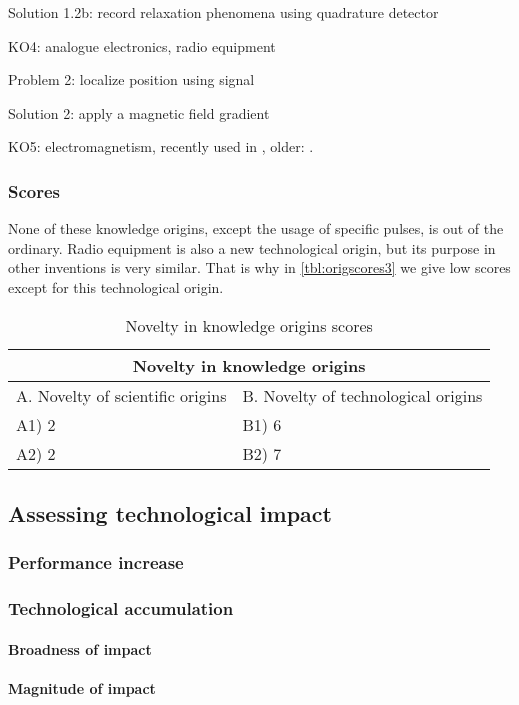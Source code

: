 Solution 1.2b: record relaxation phenomena using quadrature detector

KO4: analogue electronics, radio equipment 

Problem 2: localize position using signal

Solution 2: apply a magnetic field gradient

KO5: electromagnetism, recently used in \cite{nanogradients1, nanogradients2},
older: \cite{oldgradients}.

\subsubsection{Scores}
None of these knowledge origins, except the usage of specific pulses, is out of
the ordinary. Radio equipment is also a new technological origin, but its
purpose in other inventions is very similar. That is why in
\autoref{tbl:origscores3} we give low scores except for this technological
origin.

\begin{table}[h]
\centering
\begin{tabular}{l l}
\hline
\multicolumn{2}{|c|}{Novelty in knowledge origins} \\
\hline
A. Novelty of scientific origins & B. Novelty of technological origins\\
A1) 2 & B1) 6\\ 
A2) 2 & B2) 7\\ 
\hline
\end{tabular}
\caption{Novelty in knowledge origins scores}
\label{tbl:origscores3}
\end{table}

\subsection{Assessing technological impact}
\subsubsection{Performance increase}

\subsubsection{Technological accumulation}
\paragraph{Broadness of impact}

\paragraph{Magnitude of impact}


